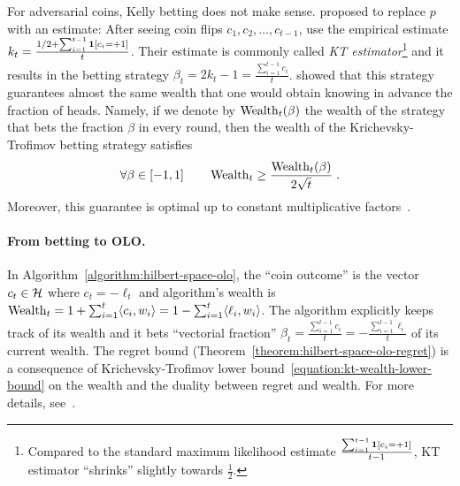 For adversarial coins, Kelly betting does not make sense.
\citet{Krichevsky-Trofimov-1981} proposed to replace $p$ with an estimate: After
seeing coin flips $c_1, c_2, \dots, c_{t-1}$, use the empirical estimate $k_t =
\frac{1/2 + \sum_{i=1}^{t-1} \mathbf{1}[c_i = +1]}{t}$. Their estimate is
commonly called \emph{KT estimator}\footnote{Compared to the standard maximum
likelihood estimate $\frac{\sum_{i=1}^{t-1} \mathbf{1}[c_i = +1]}{t-1}$, KT
estimator ``shrinks'' slightly towards $\frac{1}{2}$.} and it results in the
betting strategy $\beta_t = 2k_t - 1 = \tfrac{\sum_{i=1}^{t-1} c_i}{t}$.
\citeauthor{Krichevsky-Trofimov-1981} showed that this strategy guarantees
almost the same wealth that one would obtain knowing in advance the fraction of
heads. Namely, if we denote by $\operatorname{Wealth}_t(\beta)$ the wealth of the strategy
that bets the fraction $\beta$ in every round, then the wealth of the
Krichevsky-Trofimov betting strategy satisfies
\begin{equation}
\label{equation:kt-wealth-lower-bound}
\forall \beta \in [-1,1] \qquad \operatorname{Wealth}_t \ge \frac{\operatorname{Wealth}_t(\beta)}{2\sqrt{t}} \; .
\end{equation}
Moreover, this guarantee is optimal up to constant multiplicative
factors~\citep{Cesa-Bianchi-Lugosi-2006}.

\paragraph{From betting to \ac{OLO}.}
In Algorithm~\ref{algorithm:hilbert-space-olo}, the ``coin outcome'' is the
vector $c_t \in \mathcal{H}$ where $c_t = -\ell_t$ and algorithm's wealth is $\operatorname{Wealth}_t =
1 + \sum_{i=1}^t \langle c_i, w_i \rangle = 1 - \sum_{i=1}^t \langle \ell_i, w_i
\rangle$.  The algorithm explicitly keeps track of its wealth and it bets
``vectorial fraction'' $\beta_t = \tfrac{\sum_{i=1}^{t-1} c_i}{t} = -
\tfrac{\sum_{i=1}^{t-1}\ell_i}{t}$ of its current wealth. The regret bound
(Theorem~\ref{theorem:hilbert-space-olo-regret}) is a consequence of
Krichevsky-Trofimov lower bound~\eqref{equation:kt-wealth-lower-bound} on the
wealth and the duality between regret and wealth.  For more details,
see~\cite{Orabona-Pal-2016-parameter-free}.
